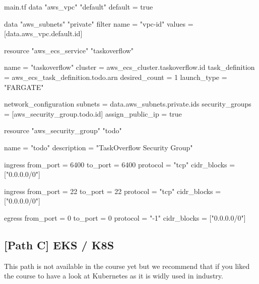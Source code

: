 \documentclass{csse4400}
\begin{document}
\begin{code}[language=terraform,numbers=none]{main.tf}
data "aws_vpc" "default" {
    default = true
}

data "aws_subnets" "private" {
  filter {
    name   = "vpc-id"
    values = [data.aws_vpc.default.id]
  }
}

resource "aws_ecs_service" "taskoverflow" {
  name            = "taskoverflow"
  cluster         = aws_ecs_cluster.taskoverflow.id
  task_definition = aws_ecs_task_definition.todo.arn
  desired_count   = 1
  launch_type     = "FARGATE"

  network_configuration {
    subnets             = data.aws_subnets.private.ids
    security_groups     = [aws_security_group.todo.id]
    assign_public_ip    = true
  }
}

resource "aws_security_group" "todo" {
  name = "todo"
  description = "TaskOverflow Security Group"

  ingress {
    from_port = 6400
    to_port = 6400
    protocol = "tcp"
    cidr_blocks = ["0.0.0.0/0"]
  }

  ingress {
    from_port = 22
    to_port = 22
    protocol = "tcp"
    cidr_blocks = ["0.0.0.0/0"]
  }

  egress {
    from_port = 0
    to_port = 0
    protocol = "-1"
    cidr_blocks = ["0.0.0.0/0"]
  }
}
\end{code}

\subsection{[Path C] EKS / K8S}

This path is not available in the course yet but we recommend that if you liked the course to have  a look at Kubernetes as it is widly used in industry.



\end{document}
